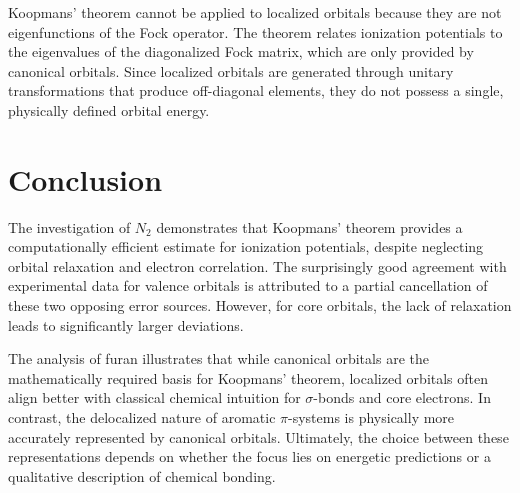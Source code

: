 \documentclass[a4paper,12pt]{scrartcl}
\begin{document}
Koopmans' theorem cannot be applied to localized orbitals because they are not eigenfunctions of the Fock operator. The theorem relates ionization potentials to the eigenvalues of the diagonalized Fock matrix, which are only provided by canonical orbitals. Since localized orbitals are generated through unitary transformations that produce off-diagonal elements, they do not possess a single, physically defined orbital energy.

\section{Conclusion}

The investigation of $N_2$ demonstrates that Koopmans' theorem provides a computationally efficient estimate for ionization potentials, despite neglecting orbital relaxation and electron correlation. The surprisingly good agreement with experimental data for valence orbitals is attributed to a partial cancellation of these two opposing error sources. However, for core orbitals, the lack of relaxation leads to significantly larger deviations. 

The analysis of furan illustrates that while canonical orbitals are the mathematically required basis for Koopmans' theorem, localized orbitals often align better with classical chemical intuition for $\sigma$-bonds and core electrons. In contrast, the delocalized nature of aromatic $\pi$-systems is physically more accurately represented by canonical orbitals. Ultimately, the choice between these representations depends on whether the focus lies on energetic predictions or a qualitative description of chemical bonding.
\end{document}
